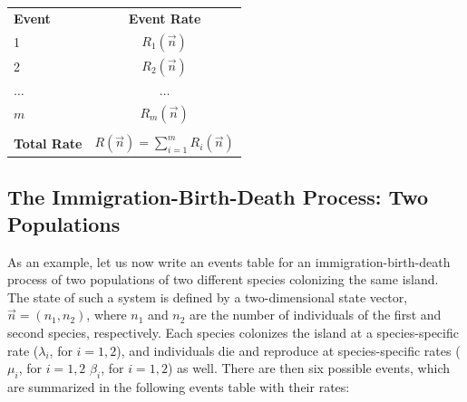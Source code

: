 \begin{center}
	\begin{tabular}{lc}
		\textbf{Event} & \textbf{Event Rate} \\
		
		1          & $R_1(\vec{n})$ \\
		2          & $R_2(\vec{n})$ \\
		$\dots$    & $\dots$        \\
		$m$        & $R_m(\vec{n})$ \\
		           &                \\
		\textbf{Total Rate} & $R(\vec{n}) = \sum_{i=1}^m R_i(\vec{n})$
	\end{tabular}
\end{center}

\subsection{The Immigration-Birth-Death Process: Two Populations}
As an example, let us now write an events table for an immigration-birth-death process of two populations of two different species colonizing the same island. The state of such a system is defined by a two-dimensional state vector, $\vec{n} = (n_1, n_2)$, where $n_1$ and $n_2$ are the number of individuals of the first and second species, respectively. Each species colonizes the island at a species-specific rate ($\lambda_i$, for $i=1,2$), and individuals die and reproduce at species-specific rates ($\mu_i$, for $i=1,2$ $\beta_i$, for $i=1,2$) as well. There are then six possible events, which are summarized in the following events table with their rates:

